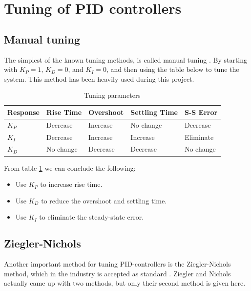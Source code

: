 %
%
%
%
\section{Tuning of PID controllers}


\subsection{Manual tuning}
The simplest of the known tuning methods, is called manual tuning \citep{zhong2006}. By starting with $K_P = 1$, $K_D = 0$, and $K_I = 0$, and then using the table below to tune the system. This method has been heavily used during this project.

\begin{table}
\begin{center}
\caption{Tuning parameters}
\begin{tabular}{| l | l | l | l | l |}
	\hline
	Response & Rise Time & Overshoot & Settling Time & S-S Error \\ \hline
	$K_P$ & Decrease & Increase & No change & Decrease \\ \hline
	$K_I$ & Decrease & Increase & Increase & Eliminate \\ \hline
	$K_D$ & No change & Decrease & Decrease & No change \\ \hline
\end{tabular}
\label{tbl:control_1}
\end{center}
\end{table}

From table \ref{tbl:control_1} we can conclude the following:

\begin{itemize}
	\item Use $K_P$ to increase rise time.
	\item Use $K_D$ to reduce the overshoot and settling time.
	\item Use $K_I$ to eliminate the steady-state error.
\end{itemize}

\subsection{Ziegler-Nichols}

Another important method for tuning PID-controllers is the Ziegler-Nichols method, which in the industry is accepted as standard \citep{copeland2008}. Ziegler and Nichols actually came up with two methods, but only their second method is given here. 

